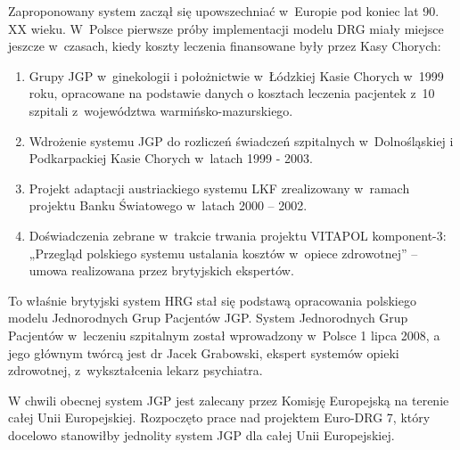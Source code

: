 Zaproponowany system zaczął się upowszechniać w~Europie pod koniec lat 90. XX wieku. W~Polsce pierwsze próby implementacji modelu DRG miały miejsce jeszcze w~czasach, kiedy koszty leczenia finansowane były przez Kasy Chorych:
\begin{enumerate}
\item Grupy JGP w~ginekologii i położnictwie w~Łódzkiej Kasie Chorych w~1999 roku, opracowane na podstawie danych o kosztach leczenia pacjentek z~10 szpitali z~województwa warmińsko-mazurskiego.
\item Wdrożenie systemu JGP do rozliczeń świadczeń szpitalnych w~Dolnośląskiej i Podkarpackiej Kasie Chorych w~latach 1999 - 2003.
\item Projekt adaptacji austriackiego systemu LKF zrealizowany w~ramach projektu Banku Światowego w~latach 2000 – 2002.
\item Doświadczenia zebrane w~trakcie trwania projektu VITAPOL komponent-3: „Przegląd polskiego systemu ustalania kosztów w~opiece zdrowotnej” – umowa realizowana przez brytyjskich ekspertów.
\end{enumerate} 
To właśnie brytyjski system HRG stał się podstawą opracowania polskiego modelu Jednorodnych Grup Pacjentów JGP. System Jednorodnych Grup Pacjentów w~leczeniu szpitalnym został wprowadzony w~Polsce 1 lipca 2008, a jego głównym twórcą jest dr Jacek Grabowski, ekspert systemów opieki zdrowotnej, z~wykształcenia lekarz psychiatra.

W chwili obecnej system JGP jest zalecany przez Komisję Europejską na terenie całej Unii Europejskiej. Rozpoczęto prace nad projektem Euro-DRG 7, który docelowo stanowiłby jednolity system JGP dla całej Unii Europejskiej.

